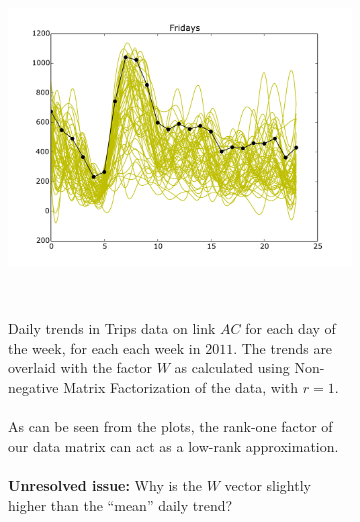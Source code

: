 \documentclass[10pt,a4paper]{amsart}
\begin{document}
\begin{figure}
    \begin{subfigure}[b]{0.6\textwidth}
        \includegraphics[width=\textwidth]
        		{Figures/Daily_trends_AC_Friday.pdf}
    \end{subfigure}
    ~
    \begin{subfigure}[b]{0.5\textwidth}
        Daily trends in Trips data on link \(AC\) for each day of the
        week, for each each week in \(2011\). The trends are overlaid
        with the factor \(W\) as calculated using Non-negative Matrix
        Factorization of the data, with \(r=1\).
        \\\\
        As can be seen from the plots, the rank-one factor of our data
        matrix can act as a low-rank approximation.
        \\\\
        \textbf{Unresolved issue:} Why is the \(W\) vector slightly
        higher than the ``mean'' daily trend?
	\end{subfigure}    
\end{figure}

\newpage
\end{document}
